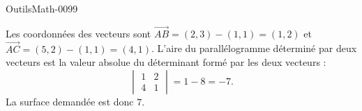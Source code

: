 
\begin{corrige}{OutilsMath-0099}

    Les coordonnées des vecteurs sont $\overrightarrow{AB}=(2,3)-(1,1)=(1,2)$ et $\overrightarrow{AC}=(5,2)-(1,1)=(4,1)$. L'aire du parallélogramme déterminé par deux vecteurs est la valeur absolue du déterminant formé par les deux vecteurs :
    \begin{equation}
        \begin{vmatrix}
            1    &   2    \\ 
            4    &   1    
        \end{vmatrix}=1-8=-7.
    \end{equation}
    La surface demandée est donc $7$.

\end{corrige}
